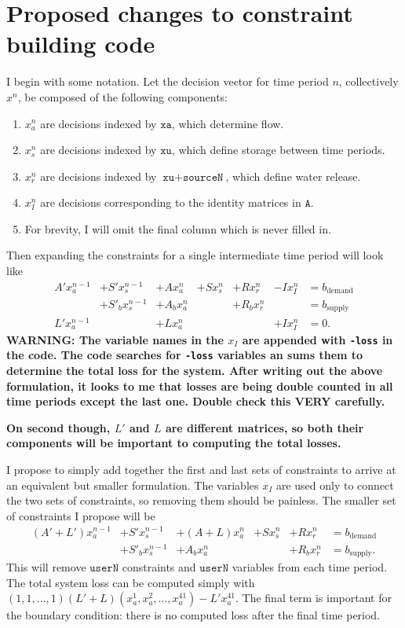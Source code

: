 \documentclass[11pt]{article}
\newcommand{\A}{\texttt{A}}
\newcommand{\xa}{\texttt{xa}}
\newcommand{\xu}{\texttt{xu}}
\newcommand{\sourceN}{\texttt{sourceN}}
\newcommand{\userN}{\texttt{userN}}
\begin{document}
\section*{Proposed changes to constraint building code}

I begin with some notation.
Let the decision vector for time period $n$, collectively $x^n$, be composed of the following components:
\begin{enumerate}
	\item $x^n_a$ are decisions indexed by $\xa$, which determine flow.
	\item $x^n_s$ are decisions indexed by $\xu$, which define storage between time periods.
	\item $x^n_r$ are decisions indexed by $\xu+\sourceN$, which define water release.
	\item $x^n_I$ are decisions corresponding to the identity matrices in $\A$.
	\item For brevity, I will omit the final column which is never filled in.
\end{enumerate}

Then expanding the constraints for a single intermediate time period will look like
\[
	\begin{array}{rrrrrrl}
		A' x^{n-1}_a & + S' x^{n-1}_s   & + A x^n_a   & + S x^n_s & + R x^n_r   & - Ix^n_I  & = b_\text{demand} \\
		             & + S'_b x^{n-1}_s & + A_b x^n_a &           & + R_b x^n_r &           & = b_\text{supply} \\
		L' x^{n-1}_a &                  & + L x^n_a   &           &             & + I x^n_I & = 0.
	\end{array}
\]
\textbf{
	WARNING: The variable names in the $x_I$ are appended with \texttt{-loss} in the code.
	The code searches for \texttt{-loss} variables an sums them to determine the total loss for the system.
	After writing out the above formulation, it looks to me that losses are being double counted in all time periods except the last one.
	Double check this VERY carefully.
}

\textbf{
	On second though, $L'$ and $L$ are different matrices, so both their components will be important to computing the total losses.
}

I propose to simply add together the first and last sets of constraints to arrive at an equivalent but smaller formulation.
The variables $x_I$ are used only to connect the two sets of constraints, so removing them should be painless.
The smaller set of constraints I propose will be
\[
	\begin{array}{rrrrrl}
		(A'+L') x^{n-1}_a & + S' x^{n-1}_s   & + (A+L) x^n_a   & + S x^n_s & + R x^n_r   & = b_\text{demand} \\
		                  & + S'_b x^{n-1}_s & + A_b x^n_a     &           & + R_b x^n_r & = b_\text{supply}.
	\end{array}
\]
This will remove $\userN$ constraints and $\userN$ variables from each time period.
The total system loss can be computed simply with $(1, 1, \dots, 1) (L'+L) (x^1_a, x^2_a, \dots, x^{41}_a) - L' x^{41}_a$.
The final term is important for the boundary condition: there is no computed loss after the final time period.
\end{document}
